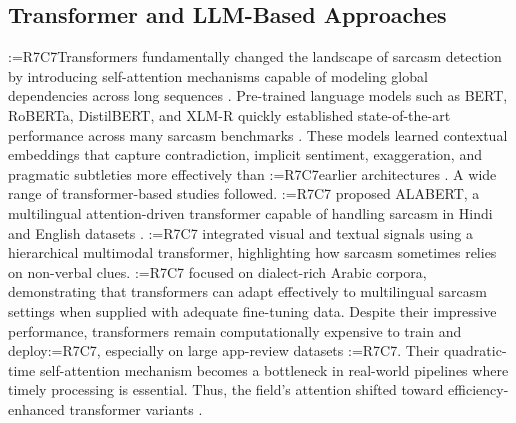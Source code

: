 \documentclass[a4paper,fleqn]{cas-sc}
\makeatletter
\newif\iftracked
\newcommand{\rv@setcolour}[1]{%
  \IfStrEq{#1}{R7C7}{\color{rvEdit}}{%
    \IfSubStr{#1}{R5}{\IfSubStr{#1}{R7}{\color{rvBoth}}{\color{rvFive}}}{\color{rvSeven}}}}
\newcommand{\rv@tag}[1]{\textsuperscript{\sffamily\bfseries\scriptsize[\StrSubstitute{#1}{,}{, }]}\,}
\newcommand{\rv@recordone}[1]{%
  \edef\rv@i{#1}%
  \ifcsdef{rv@n@\rv@i}{}{\csgdef{rv@n@\rv@i}{0}}%
  \csxdef{rv@n@\rv@i}{\the\numexpr\csuse{rv@n@\rv@i}+1\relax}%
  \begingroup\edef\@currentlabel{\rv@i}\label{rv:\rv@i:\csuse{rv@n@\rv@i}}\endgroup}
\newcommand{\rv@record}[1]{\@for\rv@id:=#1\do{\expandafter\rv@recordone\expandafter{\rv@id}}}
\DeclareRobustCommand{\rcx}[2]{\iftracked{\rv@setcolour{#1}\rv@tag{#1}#2}\else#2\fi}
\DeclareRobustCommand{\rcmark}[1]{\rv@record{#1}}
\DeclareRobustCommand{\rcrep}[3]{\rv@record{#1}\iftracked{\rv@setcolour{#1}\rv@tag{#1}\rv@strike{#2} #3}\else#3\fi}
\DeclareRobustCommand{\rce}[1]{\rv@record{R7C7}\iftracked{\color{rvEdit}#1}\else#1\fi}
\makeatother
\begin{document}
\subsection{\texorpdfstring{\rcx{R7C7}{Transformer and LLM-Based Approaches}}{Transformer and LLM-Based Approaches}}
\rcmark{R7C7}Transformers fundamentally changed the landscape of sarcasm detection by introducing self-attention mechanisms capable of modeling global dependencies across long sequences \citep{devlin2019bert,galal2024arabic}. Pre-trained language models such as BERT, RoBERTa, DistilBERT, and XLM-R quickly established state-of-the-art performance across many sarcasm benchmarks \citep{sukhavasi2024effective,liu2024sarcasm}. These models learned contextual embeddings that capture contradiction, implicit sentiment, exaggeration, and pragmatic subtleties more effectively than \rcrep{R7C7}{any prior architecture}{earlier architectures} \citep{anitha2024sentiment}. A wide range of transformer-based studies followed. \rce{\citet{sukhavasi2024effective}} proposed ALABERT, a multilingual attention-driven transformer capable of handling sarcasm in Hindi and English datasets \citep[see also][]{yenkikar2026sarcasm}. \rce{\citet{liu2024sarcasm}} integrated visual and textual signals using a hierarchical multimodal transformer, highlighting how sarcasm sometimes relies on non-verbal clues. \rce{\citet{galal2024arabic}} focused on dialect-rich Arabic corpora, demonstrating that transformers can adapt effectively to multilingual sarcasm settings when supplied with adequate fine-tuning data. Despite their impressive performance, transformers remain computationally expensive to train and deploy\rce{,} especially on large app-review datasets \rce{\citep{wen2026transformer}}. Their quadratic-time self-attention mechanism becomes a bottleneck in real-world pipelines where timely processing is essential. Thus, the field's attention shifted toward efficiency-enhanced transformer variants \citep{dubey2026efficient,bodige2026dual,suryawanshi2026multilingual}.
\end{document}
